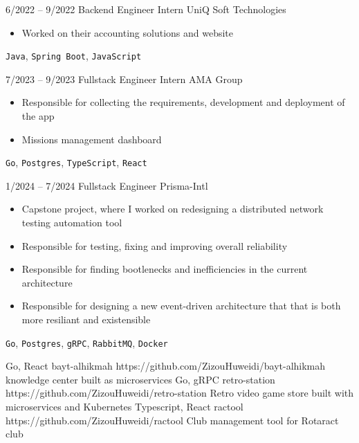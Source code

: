 \documentclass[9pt]{developercv} %
\begin{document}
\vspace{-10 pt}
\begin{entrylist}
	\entry
	{6/2022 -- 9/2022}
	{Backend Engineer Intern}
	{UniQ Soft Technologies}
	{\vspace{-10pt}
		\begin{itemize}[noitemsep,topsep=0pt,parsep=0pt,partopsep=0pt, leftmargin=-1pt]
			\item Worked on their accounting solutions and website
		\end{itemize}
		\texttt{Java}, \texttt{Spring Boot}, \texttt{JavaScript}}
	\entry
	{7/2023 -- 9/2023}
	{Fullstack Engineer Intern}
	{AMA Group}
	{\vspace{-10pt}
		\begin{itemize}[noitemsep,topsep=0pt,parsep=0pt,partopsep=0pt, leftmargin=-1pt]
			\item Responsible for collecting the requirements, development and deployment of the app
			\item Missions management dashboard
		\end{itemize}
		\texttt{Go}, \texttt{Postgres}, \texttt{TypeScript}, \texttt{React}}
	\entry
	{1/2024 -- 7/2024}
	{Fullstack Engineer}
	{Prisma-Intl}
	{\vspace{-10pt}
		\begin{itemize}[noitemsep,topsep=0pt,parsep=0pt,partopsep=0pt, leftmargin=-1pt]
			\item Capstone project, where I worked on redesigning a distributed network testing automation tool
			\item Responsible for testing, fixing and improving overall reliability
			\item Responsible for finding bootlenecks and inefficiencies in the current architecture
			\item Responsible for designing a new event-driven architecture that that is both more resiliant and existensible
		\end{itemize}
		\texttt{Go}, \texttt{Postgres}, \texttt{gRPC}, \texttt{RabbitMQ}, \texttt{Docker}}
\end{entrylist}

\begin{entrylist}
	\entry
	{Go, React}
	{bayt-alhikmah}
	{https://github.com/ZizouHuweidi/bayt-alhikmah}
	{knowledge center built as microservices}
	\entry
	{Go, gRPC}
	{retro-station}
	{https://github.com/ZizouHuweidi/retro-station}
	{Retro video game store built with microservices and Kubernetes}
	\entry
	{Typescript, React}
	{ractool}
	{https://github.com/ZizouHuweidi/ractool}
	{Club management tool for Rotaract club}
\end{entrylist}
\end{document}
